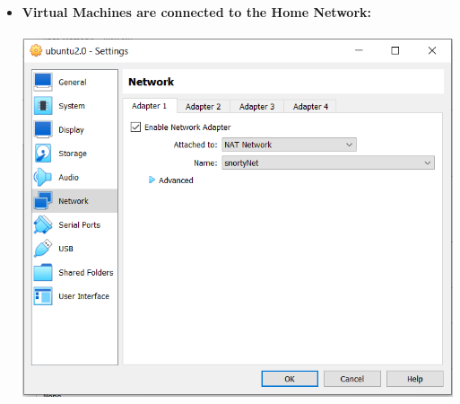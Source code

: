 \documentclass{article}
\begin{document}
\begin{itemize}
    \item \textbf{Virtual Machines are connected to the Home Network:}\\\\
    \includegraphics[width=1.0\textwidth]{images/device_connection.PNG}
\end{itemize}
\clearpage
\end{document}
